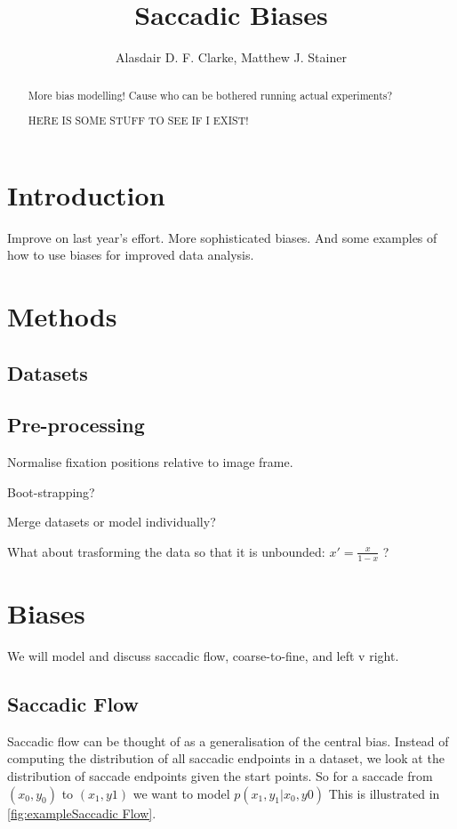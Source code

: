 \documentclass[a4paper, onecolumn, oneside, 11pt]{article}
\title{Saccadic Biases}
\author{Alasdair D. F. Clarke, Matthew J. Stainer}
\begin{document}
\maketitle

\begin{abstract}
More bias modelling! Cause who can be bothered running actual experiments?

HERE IS SOME STUFF TO SEE IF I EXIST!
\end{abstract}


\section{Introduction}

Improve on last year's \citep{clarke-tatler2014} effort. More sophisticated biases. And some examples of how to use biases for improved data analysis. 

\section{Methods}

\subsection{Datasets}

\subsection{Pre-processing}

Normalise fixation positions relative to image frame. 

Boot-strapping? 

Merge datasets or model individually? 

What about trasforming the data so that it is unbounded: $x'=\frac{x}{1-x}$   ? 

\section{Biases}

We will model and discuss saccadic flow, coarse-to-fine, and left v right. 

\subsection{Saccadic Flow}

Saccadic flow can be thought of as a generalisation of the central bias. Instead of computing the distribution of all saccadic endpoints in a dataset, we look at the distribution of saccade endpoints given the start points. So for a saccade from $(x_0, y_0)$ to $(x_1, y1)$ we want to model $p(x_1,y_1|x_0, y0)$ This is illustrated in \ref{fig:exampleSaccadic Flow}.
\end{document}
